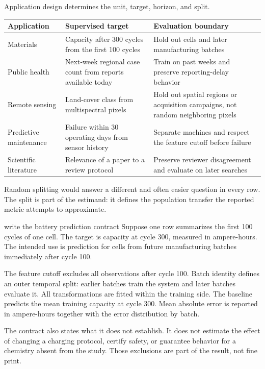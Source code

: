 Application design determines the unit, target, horizon, and split.

\begin{tabularx}{\textwidth}{@{}>{\raggedright\arraybackslash}p{}>{\raggedright\arraybackslash}p{}>{\raggedright\arraybackslash}X@{}}
\toprule
Application & Supervised target & Evaluation boundary \\
\midrule
Materials & Capacity after 300 cycles from the first 100 cycles & Hold out
cells and later manufacturing batches \\
Public health & Next-week regional case count from reports available today &
Train on past weeks and preserve reporting-delay behavior \\
Remote sensing & Land-cover class from multispectral pixels & Hold out spatial
regions or acquisition campaigns, not random neighboring pixels \\
Predictive maintenance & Failure within 30 operating days from sensor history
& Separate machines and respect the feature cutoff before failure \\
Scientific literature & Relevance of a paper to a review protocol & Preserve
reviewer disagreement and evaluate on later searches \\
\bottomrule
\end{tabularx}

Random splitting would answer a different and often easier question in every
row. The split is part of the estimand: it defines the population transfer the
reported metric attempts to approximate.

\begin{workedexample}{write the battery prediction contract}
Suppose one row summarizes the first 100 cycles of one cell. The target is
capacity at cycle 300, measured in ampere-hours. The intended use is prediction
for cells from future manufacturing batches immediately after cycle 100.

The feature cutoff excludes all observations after cycle 100. Batch identity
defines an outer temporal split: earlier batches train the system and later
batches evaluate it. All transformations are fitted within the training side.
The baseline predicts the mean training capacity at cycle 300. Mean absolute
error is reported in ampere-hours together with the error distribution by batch.

The contract also states what it does not establish. It does not estimate the
effect of changing a charging protocol, certify safety, or guarantee behavior
for a chemistry absent from the study. Those exclusions are part of the result,
not fine print.
\end{workedexample}

